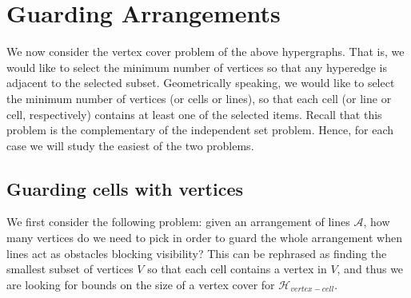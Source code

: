 \documentclass[11pt,a4paper]{article}
\newcommand{\Hvertexcell}{{\mathcal H}_{vertex-cell}}
\newcommand{\sholong}[2]{#2}
\begin{document}
\section{Guarding Arrangements}\label{sec:guarding}
\sholong{}{We now consider the vertex cover problem of the above hypergraphs. That is, we would like to select the minimum number of vertices so that any hyperedge is adjacent to the selected subset. Geometrically speaking, we would like to select the minimum number of vertices (or cells or lines), so that each cell (or line or cell, respectively) contains at least one of the selected items. Recall that this problem is the complementary of the independent set problem. Hence, for each case we will study the easiest of the two problems.   

}
\subsection{Guarding cells with vertices}

We first consider the following problem: given an arrangement of lines $\mathcal{A}$, how many vertices do we need to pick in order to guard the whole arrangement when lines act as obstacles blocking visibility? This can be rephrased as finding the smallest subset of vertices $V$ so that each cell contains a vertex in $V$, and thus we are looking for bounds on the size of a vertex cover for $\Hvertexcell$.
\end{document}
